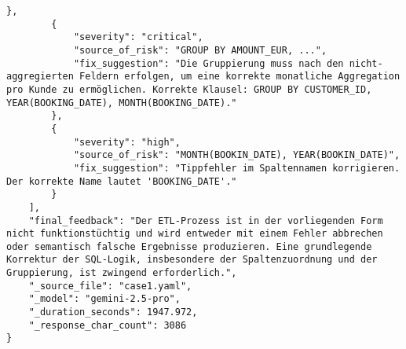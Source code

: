 \begin{lstlisting}[caption={Ausgabe: GEMINI 2.5 Pro Anwendungsfall 1 Konsistenzdurchlauf},label={gemini_case1_prompt2}]
        },
        {
            "severity": "critical",
            "source_of_risk": "GROUP BY AMOUNT_EUR, ...",
            "fix_suggestion": "Die Gruppierung muss nach den nicht-aggregierten Feldern erfolgen, um eine korrekte monatliche Aggregation pro Kunde zu ermöglichen. Korrekte Klausel: GROUP BY CUSTOMER_ID, YEAR(BOOKING_DATE), MONTH(BOOKING_DATE)."
        },
        {
            "severity": "high",
            "source_of_risk": "MONTH(BOOKIN_DATE), YEAR(BOOKIN_DATE)",
            "fix_suggestion": "Tippfehler im Spaltennamen korrigieren. Der korrekte Name lautet 'BOOKING_DATE'."
        }
    ],
    "final_feedback": "Der ETL-Prozess ist in der vorliegenden Form nicht funktionstüchtig und wird entweder mit einem Fehler abbrechen oder semantisch falsche Ergebnisse produzieren. Eine grundlegende Korrektur der SQL-Logik, insbesondere der Spaltenzuordnung und der Gruppierung, ist zwingend erforderlich.",
    "_source_file": "case1.yaml",
    "_model": "gemini-2.5-pro",
    "_duration_seconds": 1947.972,
    "_response_char_count": 3086
}
\end{lstlisting}

